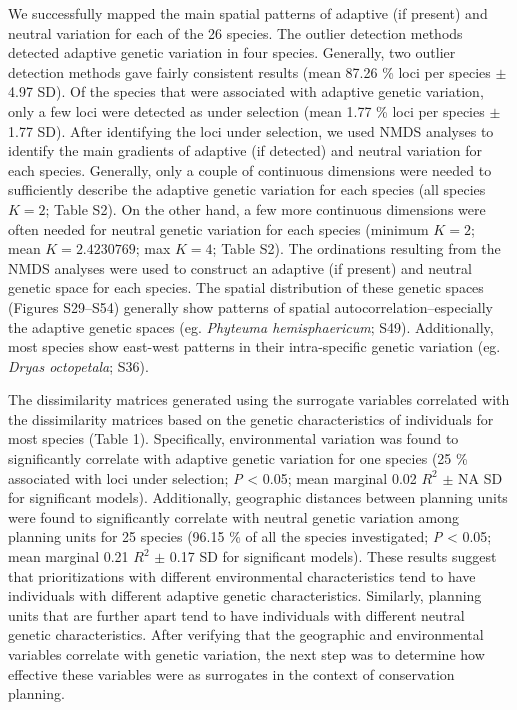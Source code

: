 \documentclass[11pt,]{article}
\begin{document}
We successfully mapped the main spatial patterns of adaptive (if
present) and neutral variation for each of the 26 species. The outlier
detection methods detected adaptive genetic variation in four species.
Generally, two outlier detection methods gave fairly consistent results
(mean 87.26 \% loci per species \(\pm\) 4.97 SD). Of the species that
were associated with adaptive genetic variation, only a few loci were
detected as under selection (mean 1.77 \% loci per species \(\pm\) 1.77
SD). After identifying the loci under selection, we used NMDS analyses
to identify the main gradients of adaptive (if detected) and neutral
variation for each species. Generally, only a couple of continuous
dimensions were needed to sufficiently describe the adaptive genetic
variation for each species (all species \(K = 2\); Table S2). On the
other hand, a few more continuous dimensions were often needed for
neutral genetic variation for each species (minimum \(K = 2\); mean
\(K = 2.4230769\); max \(K = 4\); Table S2). The ordinations resulting
from the NMDS analyses were used to construct an adaptive (if present)
and neutral genetic space for each species. The spatial distribution of
these genetic spaces (Figures S29--S54) generally show patterns of
spatial autocorrelation--especially the adaptive genetic spaces (eg.
\emph{Phyteuma hemisphaericum}; S49). Additionally, most species show
east-west patterns in their intra-specific genetic variation (eg.
\emph{Dryas octopetala}; S36).

The dissimilarity matrices generated using the surrogate variables
correlated with the dissimilarity matrices based on the genetic
characteristics of individuals for most species (Table 1). Specifically,
environmental variation was found to significantly correlate with
adaptive genetic variation for one species (25 \% associated with loci
under selection; \emph{P} \textless{} 0.05; mean marginal 0.02 \(R^2\)
\(\pm\) NA SD for significant models). Additionally, geographic
distances between planning units were found to significantly correlate
with neutral genetic variation among planning units for 25 species
(96.15 \% of all the species investigated; \emph{P} \textless{} 0.05;
mean marginal 0.21 \(R^2\) \(\pm\) 0.17 SD for significant models).
These results suggest that prioritizations with different environmental
characteristics tend to have individuals with different adaptive genetic
characteristics. Similarly, planning units that are further apart tend
to have individuals with different neutral genetic characteristics.
After verifying that the geographic and environmental variables
correlate with genetic variation, the next step was to determine how
effective these variables were as surrogates in the context of
conservation planning.
\end{document}

